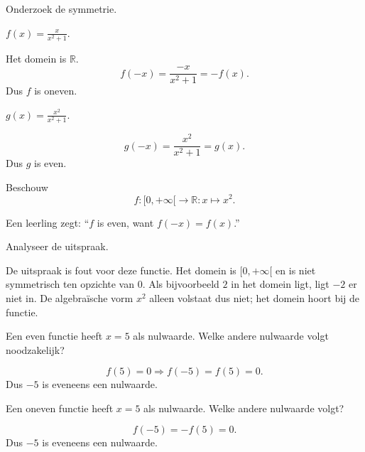 \documentclass{ximera}
\begin{document}
\begin{oefening}{\oefB\ESS}

Onderzoek de symmetrie.

\begin{question}
\(
f(x)=\frac{x}{x^2+1}.
\)
\begin{oplossing}
Het domein is \(\mathbb R\).
\[
f(-x)=\frac{-x}{x^2+1}=-f(x).
\]
Dus \(f\) is oneven.
\end{oplossing}
\end{question}

\begin{question}
\(
g(x)=\frac{x^2}{x^2+1}.
\)
\begin{oplossing}
\[
g(-x)=\frac{x^2}{x^2+1}=g(x).
\]
Dus \(g\) is even.
\end{oplossing}
\end{question}

\end{oefening}



\begin{oefening}{\oefU\ESS}

Beschouw
\[
f:[0,+\infty[\to\mathbb R:x\mapsto x^2.
\]

Een leerling zegt:
``\(f\) is even, want \(f(-x)=f(x)\).''

Analyseer de uitspraak.

\begin{oplossing}
De uitspraak is fout voor deze functie.
Het domein is \([0,+\infty[\) en is niet symmetrisch ten opzichte van \(0\).
Als bijvoorbeeld \(2\) in het domein ligt, ligt \(-2\) er niet in.
De algebraïsche vorm \(x^2\) alleen volstaat dus niet; het domein hoort bij de functie.
\end{oplossing}

\end{oefening}

\begin{oefening}{\oefU\ESS}

\begin{question}
Een even functie heeft \(x=5\) als nulwaarde. Welke andere nulwaarde volgt
noodzakelijk?
\begin{oplossing}
\[
f(5)=0\Rightarrow f(-5)=f(5)=0.
\]
Dus \(-5\) is eveneens een nulwaarde.
\end{oplossing}
\end{question}

\begin{question}
Een oneven functie heeft \(x=5\) als nulwaarde. Welke andere nulwaarde volgt?
\begin{oplossing}
\[
f(-5)=-f(5)=0.
\]
Dus \(-5\) is eveneens een nulwaarde.
\end{oplossing}
\end{question}

\end{oefening}
\end{document}
